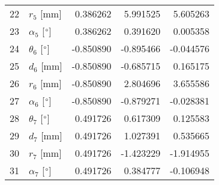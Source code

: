 \documentclass{standalone}%
\begin{document}
\begin{tabular}{llrrr}
22 &              $r_{5}$ [mm] &  0.386262 &   5.991525 &   5.605263 \\
23 &  $\alpha_{5}$ [$\degree$] &  0.386262 &   0.391620 &   0.005358 \\
24 &  $\theta_{6}$ [$\degree$] & -0.850890 &  -0.895466 &  -0.044576 \\
25 &              $d_{6}$ [mm] & -0.850890 &  -0.685715 &   0.165175 \\
26 &              $r_{6}$ [mm] & -0.850890 &   2.804696 &   3.655586 \\
27 &  $\alpha_{6}$ [$\degree$] & -0.850890 &  -0.879271 &  -0.028381 \\
28 &  $\theta_{7}$ [$\degree$] &  0.491726 &   0.617309 &   0.125583 \\
29 &              $d_{7}$ [mm] &  0.491726 &   1.027391 &   0.535665 \\
30 &              $r_{7}$ [mm] &  0.491726 &  -1.423229 &  -1.914955 \\
31 &  $\alpha_{7}$ [$\degree$] &  0.491726 &   0.384777 &  -0.106948 \\
\bottomrule
\end{tabular}
%
\end{document}
